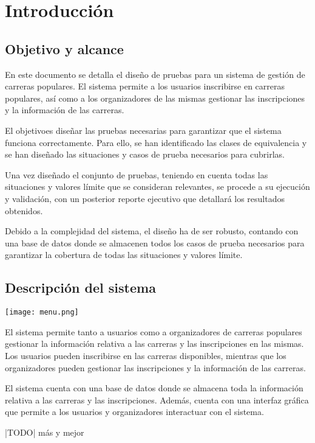 \chapter{Introducción}
\section{Objetivo y alcance}
En este documento se detalla el diseño de pruebas para un sistema de gestión de carreras populares.
El sistema permite a los usuarios inscribirse en carreras populares, así como a los organizadores de
las mismas gestionar las inscripciones y la información de las carreras.

El objetivoes diseñar las pruebas necesarias para garantizar que el sistema funciona correctamente.
Para ello, se han identificado las clases de equivalencia y se han diseñado las situaciones y casos
de prueba necesarios para cubrirlas.

Una vez diseñado el conjunto de pruebas, teniendo en cuenta todas las situaciones y valores límite que se
consideran relevantes, se procede a su ejecución y validación, con un posterior reporte ejecutivo que
detallará los resultados obtenidos.

Debido a la complejidad del sistema, el diseño ha de ser robusto, contando con una base de datos donde
se almacenen todos los casos de prueba necesarios para garantizar la cobertura de todas las situaciones
y valores límite.

\section{Descripción del sistema}
\begin{minipage}{\linewidth}
	\centering
	\texttt{[image: menu.png]}
\end{minipage}

El sistema permite tanto a usuarios como a organizadores de carreras populares gestionar la información
relativa a las carreras y las inscripciones en las mismas. Los usuarios pueden inscribirse en las carreras
disponibles, mientras que los organizadores pueden gestionar las inscripciones y la información de las
carreras.

El sistema cuenta con una base de datos donde se almacena toda la información relativa a las carreras y
las inscripciones. Además, cuenta con una interfaz gráfica que permite a los usuarios y organizadores
interactuar con el sistema.

|TODO| más y mejor
